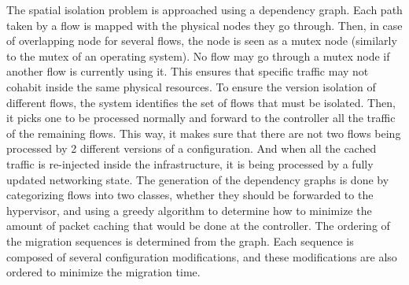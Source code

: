 The spatial isolation problem is approached using a dependency graph. Each path taken by a flow is mapped with the physical nodes they go through. Then, in case of overlapping node for several flows, the node is seen as a mutex node (similarly to the mutex of an operating system).
No flow may go through a mutex node if another flow is currently using it.
This ensures that specific traffic may not cohabit inside the same physical resources.
To ensure the version isolation of different flows, the system identifies the set of flows that must be isolated. Then, it picks one to be processed normally and forward to the controller all the traffic of the remaining flows. This way, it makes sure that there are not two flows being processed by 2 different versions of a configuration. And when all the cached traffic is re-injected inside the infrastructure, it is being processed by a fully updated networking state.
The generation of the dependency graphs is done by categorizing flows into two classes, whether they should be forwarded to the hypervisor, and using a greedy algorithm to determine how to minimize the amount of packet caching that would be done at the controller.
The ordering of the migration sequences is determined from the graph. Each sequence is composed of several configuration modifications, and these modifications are also ordered to minimize the migration time. 


